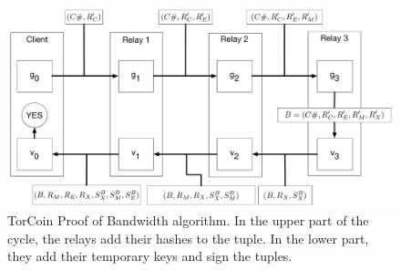 \begin{figure}[t]
\centering
\includegraphics[scale=0.3]{torcoin_cycle.pdf}
\caption
{
TorCoin Proof of Bandwidth algorithm. In the upper part of the cycle, the relays
add their hashes to the tuple. In the lower part, they add their temporary keys
and sign the tuples.
}
\end{figure}
